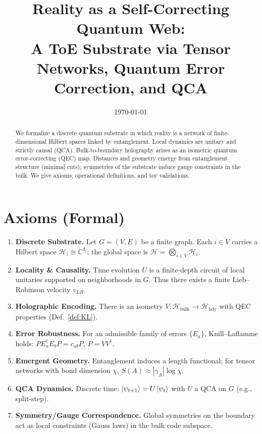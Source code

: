 \documentclass[11pt]{article}
\title{Reality as a Self-Correcting Quantum Web:\\
A ToE Substrate via Tensor Networks, Quantum Error Correction, and QCA}
\author{}
\date{\today}
\begin{document}
\maketitle

\begin{abstract}
We formalize a discrete quantum substrate in which reality is a network of finite-dimensional Hilbert spaces linked by entanglement. Local dynamics are unitary and strictly causal (QCA). Bulk-to-boundary holography arises as an isometric quantum error-correcting (QEC) map. Distances and geometry emerge from entanglement structure (minimal cuts); symmetries of the substrate induce gauge constraints in the bulk. We give axioms, operational definitions, and toy validations.
\end{abstract}

\section{Axioms (Formal)}
\begin{enumerate}
  \item \textbf{Discrete Substrate.} Let $G=(V,E)$ be a finite graph. Each $i\in V$ carries a Hilbert space $\mathcal{H}_i \cong \mathbb{C}^{d_i}$; the global space is $\mathcal{H} = \bigotimes_{i\in V}\mathcal{H}_i$.
  \item \textbf{Locality \& Causality.} Time evolution $U$ is a finite-depth circuit of local unitaries supported on neighborhoods in $G$. Thus there exists a finite Lieb--Robinson velocity $v_{LR}$.
  \item \textbf{Holographic Encoding.} There is an isometry $V:\mathcal{H}_{\mathrm{bulk}}\to \mathcal{H}_{\mathrm{bdy}}$ with QEC properties (Def.~\ref{def:KL}).
  \item \textbf{Error Robustness.} For an admissible family of errors $\{E_a\}$, Knill--Laflamme holds: $P E_a^\dagger E_b P = c_{ab} P$, $P=VV^\dagger$.
  \item \textbf{Emergent Geometry.} Entanglement induces a length functional; for tensor networks with bond dimension $\chi$, $S(A)\approx |\gamma_A| \log \chi$.
  \item \textbf{QCA Dynamics.} Discrete time: $\ket{\psi_{t+1}} = U \ket{\psi_t}$ with $U$ a QCA on $G$ (e.g., split-step).
  \item \textbf{Symmetry/Gauge Correspondence.} Global symmetries on the boundary act as local constraints (Gauss laws) in the bulk code subspace.
\end{enumerate}
\end{document}
